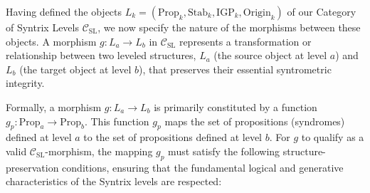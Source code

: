 \documentclass[
    12pt,              %
    a4paper,           %
    headings=normal,   %
    twoside=true,      %
    BCOR=8mm,          %
]{scrbook}
\begin{document}
Having defined the objects \(L_k = (\text{Prop}_k, \text{Stab}_k, \text{IGP}_k, \text{Origin}_k)\) of our Category of Syntrix Levels \(\mathcal{C}_{\text{SL}}\), we now specify the nature of the morphisms between these objects. A morphism \(g: L_a \to L_b\) in \(\mathcal{C}_{\text{SL}}\) represents a transformation or relationship between two leveled structures, \(L_a\) (the source object at level \(a\)) and \(L_b\) (the target object at level \(b\)), that preserves their essential syntrometric integrity.

Formally, a morphism \(g: L_a \to L_b\) is primarily constituted by a function \(g_p: \text{Prop}_a \to \text{Prop}_b\). This function \(g_p\) maps the set of propositions (syndromes) defined at level \(a\) to the set of propositions defined at level \(b\). For \(g\) to qualify as a valid \(\mathcal{C}_{\text{SL}}\)-morphism, the mapping \(g_p\) must satisfy the following structure-preservation conditions, ensuring that the fundamental logical and generative characteristics of the Syntrix levels are respected:
\end{document}
